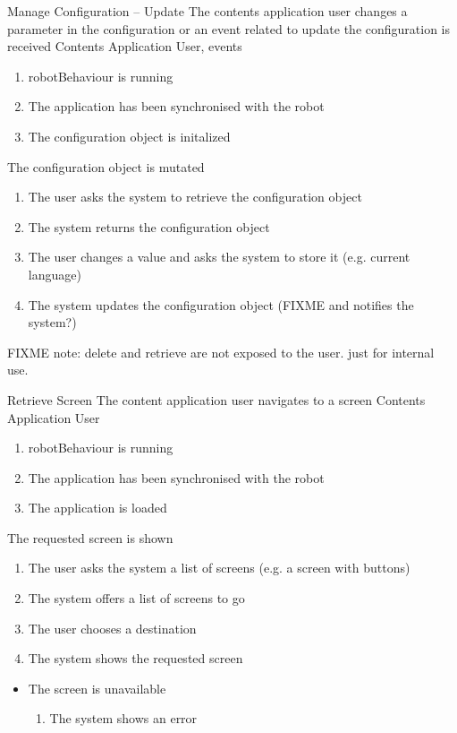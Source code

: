 \begin{suc}
{Manage Configuration -- Update}
{The contents application user changes a parameter in the configuration or an event related to update the configuration is received}
{Contents Application User, events}
{
	\begin{enumerate}
        \item robotBehaviour is running
        \item The application has been synchronised with the robot
        \item The configuration object is initalized
    \end{enumerate}
}
{
The configuration object is mutated
}
{
    \begin{enumerate}
        \item The user asks the system to retrieve the configuration object
        \item The system returns the configuration object
        \item The user changes a value and asks the system to store it (e.g. current language)
		\item The system updates the configuration object (FIXME and notifies the system?)
    \end{enumerate}
}
{     
}
\end{suc}

FIXME note: delete and retrieve are not exposed to the user. just for internal use.



\begin{suc}
{Retrieve Screen}
{The content application user navigates to a screen }
{Contents Application User}
{
	\begin{enumerate}
        \item robotBehaviour is running
        \item The application has been synchronised with the robot
        \item The application is loaded
    \end{enumerate}
}
{
The requested screen is shown
}
{
    \begin{enumerate}
		\item The user asks the system a list of screens (e.g. a screen with buttons)
        \item The system offers a list of screens to go
        \item The user chooses a destination
        \item The system shows the requested screen
    \end{enumerate}
}
{
    \begin{itemize}
	    \item The screen is unavailable
	    \begin{enumerate}
	    	\item The system shows an error
	    \end{enumerate}
    \end{itemize}
		
}
\end{suc}

